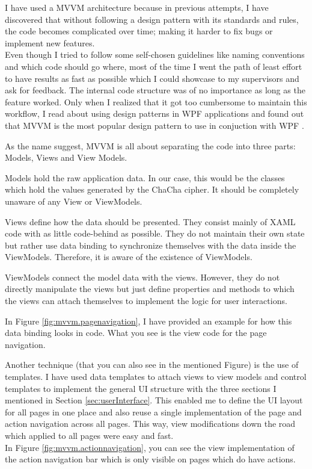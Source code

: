 I have used a MVVM architecture because in previous attempts, I have discovered that without following a design pattern with its standards and rules, the code becomes complicated over time; making it harder to fix bugs or implement new features. \\
Even though I tried to follow some self-chosen guidelines like naming conventions and which code should go where, most of the time I went the path of least effort to have results as fast as possible which I could showcase to my supervisors and ask for feedback. The internal code structure was of no importance as long as the feature worked. Only when I realized that it got too cumbersome to maintain this workflow, I read about using design patterns in WPF applications and found out that MVVM is the most popular design pattern to use in conjuction with WPF \cite{mvvm-wpf}.

As the name suggest, MVVM is all about separating the code into three parts: Models, Views and View Models.

Models hold the raw application data. In our case, this would be the classes which hold the values generated by the ChaCha cipher. It should be completely unaware of any View or ViewModels.

Views define how the data should be presented. They consist mainly of XAML code with as little code-behind as possible. They do not maintain their own state but rather use data binding to synchronize themselves with the data inside the ViewModels. Therefore, it is aware of the existence of ViewModels.

ViewModels connect the model data with the views. However, they do not directly manipulate the views but just define properties and methods to which the views can attach themselves to implement the logic for user interactions.

In Figure \ref{fig:mvvm.pagenavigation}, I have provided an example for how this data binding looks in code. What you see is the view code for the page navigation.

Another technique (that you can also see in the mentioned Figure) is the use of templates. I have used data templates to attach views to view models and control templates to implement the general UI structure with the three sections I mentioned in Section \ref{sec:userInterface}. This enabled me to define the UI layout for all pages in one place and also reuse a single implementation of the page and action navigation across all pages. This way, view modifications down the road which applied to all pages were easy and fast. \\ In Figure \ref{fig:mvvm.actionnavigation}, you can see the view implementation of the action navigation bar which is only visible on pages which do have actions.

